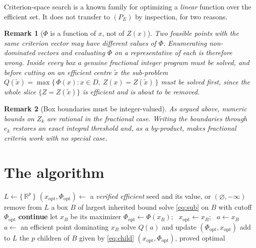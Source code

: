 \documentclass[11pt,a4paper]{article}
\newtheorem{remark}{Remark}
\newcommand{\Z}{Z}
\newcommand{\Dset}{D}
\newcommand{\R}{\mathbb{R}}
\begin{document}
Criterion-space search is a known family for optimizing a \emph{linear}
function over the efficient set. It does not transfer to $(P_E)$ by
inspection, for two reasons.

\begin{remark}[$\Phi$ is a function of $x$, not of $\Z(x)$]
\label{rem:notZ}
Two feasible points with the same criterion vector may have different values of
$\Phi$. Enumerating non-dominated vectors and evaluating $\Phi$ on a
representative of each is therefore wrong. Inside every box a genuine
fractional integer program must be solved, and before cutting on an efficient
centre $\tilde{x}$ the sub-problem
$Q(\tilde{x}) = \max \{\, \Phi(x) : x \in \Dset,\ \Z(x) = \Z(\tilde{x}) \,\}$
must be solved first, since the whole slice $\{\Z = \Z(\tilde{x})\}$ is
efficient and is about to be removed.
\end{remark}

\begin{remark}[Box boundaries must be integer-valued]
As argued above, numeric bounds on $\Z_k$ are rational in the fractional case.
Writing the boundaries through $e_k$ restores an exact integral threshold and,
as a by-product, makes fractional criteria work with no special case.
\end{remark}

\section{The algorithm}

\begin{algorithm}[h]
\caption{Criterion-space search for $(P_E)$, optionally seeded}
\label{alg:box}
\begin{algorithmic}[1]
\State $L \gets \{\, \R^p \,\}$
\State $(x_{\mathrm{opt}}, \Phi_{\mathrm{opt}}) \gets$ a \emph{verified
       efficient} seed and its value, or $(\varnothing, -\infty)$
  \State remove from $L$ a box $B$ of largest inherited bound
  \State solve \eqref{eq:sub} on $B$ with cutoff $\Phi_{\mathrm{opt}}$
     \State \textbf{continue} 
  \EndIf
  \State let $x_B$ be its maximizer
     \State $\Phi_{\mathrm{opt}} \gets \Phi(x_B)$; \
            $x_{\mathrm{opt}} \gets x_B$; \ $a \gets x_B$
     \Statex {}
  \Else
     \State $a \gets$ an efficient point dominating $x_B$
     \State solve $Q(a)$ and update $(\Phi_{\mathrm{opt}}, x_{\mathrm{opt}})$
  \EndIf
  \State add to $L$ the $p$ children of $B$ given by \eqref{eq:child}
\EndWhile
\State \Return $(x_{\mathrm{opt}}, \Phi_{\mathrm{opt}})$, proved optimal
\end{algorithmic}
\end{algorithm}
\end{document}
